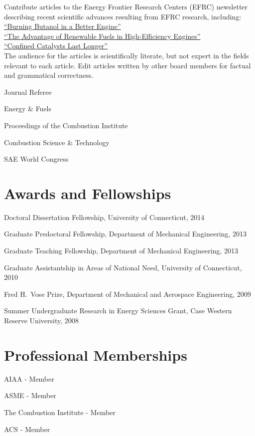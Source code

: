\begin{innerlist}
\item[] Contribute articles to the Energy Frontier Research Centers (EFRC)
newsletter describing recent scientific advances resulting from
EFRC research, including:\\
\href{http://www.energyfrontier.us/newsletter/201210/burning-butanol-better-engine}
{\color{blue}``Burning Butanol in a Better Engine''}\\
\href{http://www.energyfrontier.us/newsletter/201401/advantage-renewable-fuels-high-efficiency-engines}
{\color{blue}``The Advantage of Renewable Fuels in High-Efficiency Engines''}\\
\href{http://www.energyfrontier.us/newsletter/201404/confined-catalysts-last-longer}
{\color{blue}``Confined Catalysts Last Longer''}\\
The audience for the articles is scientifically literate, but not
expert in the fields relevant to each article. Edit articles written
by other board members for factual and grammatical correctness.
\end{innerlist}

\vspace{\baselineskip}

Journal Referee
   \begin{innerlist}
       \item[] Energy \& Fuels
       \item[] Proceedings of the Combustion Institute
       \item[] Combustion Science \& Technology
       \item[] SAE World Congress
   \end{innerlist}

\vspace{0.5em}

\section{{\sectionfont Awards and Fellowships}}

Doctoral Dissertation Fellowship, University of Connecticut, 2014

Graduate Predoctoral Fellowship, Department of Mechanical
Engineering, 2013

Graduate Teaching Fellowship, Department of Mechanical Engineering, 2013

Graduate Assistantship in Areas of National
Need, University of Connecticut, 2010

Fred H.\ Vose Prize, Department of Mechanical and
Aerospace Engineering, 2009

Summer Undergraduate Research in Energy Sciences
Grant, Case Western Reserve University, 2008

\section{{\sectionfont Professional Memberships}}
AIAA - Member

ASME - Member

The Combustion Institute - Member

ACS - Member



